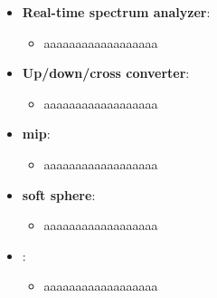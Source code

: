 
\begin{itemize}
	\item \textbf{Real-time spectrum analyzer}:
	      \begin{itemize}
		      \item aaaaaaaaaaaaaaaaaa
	      \end{itemize}
	\item \textbf{Up/down/cross converter}:
	      \begin{itemize}
		      \item aaaaaaaaaaaaaaaaaa
	      \end{itemize}
	\item \textbf{mip}:
	      \begin{itemize}
		      \item aaaaaaaaaaaaaaaaaa
	      \end{itemize}
	\item \textbf{soft sphere}:
	      \begin{itemize}
		      \item aaaaaaaaaaaaaaaaaa
	      \end{itemize}
	\item \textbf{}:
	      \begin{itemize}
		      \item aaaaaaaaaaaaaaaaaa
	      \end{itemize}
\end{itemize}